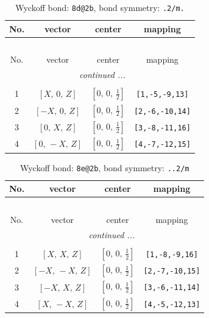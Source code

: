 \documentclass[fleqn,8pt]{jsarticle}
\begin{document}
\begin{longtable}{cccc}
\caption{Wyckoff bond: {\tt 8d@2b}, bond symmetry: {\tt .2/m.}}
 \\
 \hline \hline
No. & vector & center & mapping \\ \hline \endfirsthead

\multicolumn{3}{l}{\tablename\ \thetable{}} \\
 \hline \hline
No. & vector & center & mapping \\ \hline \endhead

 \hline \hline
\multicolumn{3}{r}{\footnotesize\it continued ...} \\ \endfoot

 \hline \hline
\multicolumn{3}{r}{} \\ \endlastfoot

1 & $\left[ X,\, 0,\, Z \right]$ & $\left[ 0,\, 0,\, \frac{1}{2} \right]$ & {\tt [1,-5,-9,13]} \\ \hline
2 & $\left[ - X,\, 0,\, Z \right]$ & $\left[ 0,\, 0,\, \frac{1}{2} \right]$ & {\tt [2,-6,-10,14]} \\ \hline
3 & $\left[ 0,\, X,\, Z \right]$ & $\left[ 0,\, 0,\, \frac{1}{2} \right]$ & {\tt [3,-8,-11,16]} \\ \hline
4 & $\left[ 0,\, - X,\, Z \right]$ & $\left[ 0,\, 0,\, \frac{1}{2} \right]$ & {\tt [4,-7,-12,15]} \\
\end{longtable}
\renewcommand{\arraystretch}{1.2}
\begin{longtable}{cccc}
\caption{Wyckoff bond: {\tt 8e@2b}, bond symmetry: {\tt ..2/m}}
 \\
 \hline \hline
No. & vector & center & mapping \\ \hline \endfirsthead

\multicolumn{3}{l}{\tablename\ \thetable{}} \\
 \hline \hline
No. & vector & center & mapping \\ \hline \endhead

 \hline \hline
\multicolumn{3}{r}{\footnotesize\it continued ...} \\ \endfoot

 \hline \hline
\multicolumn{3}{r}{} \\ \endlastfoot

1 & $\left[ X,\, X,\, Z \right]$ & $\left[ 0,\, 0,\, \frac{1}{2} \right]$ & {\tt [1,-8,-9,16]} \\ \hline
2 & $\left[ - X,\, - X,\, Z \right]$ & $\left[ 0,\, 0,\, \frac{1}{2} \right]$ & {\tt [2,-7,-10,15]} \\ \hline
3 & $\left[ - X,\, X,\, Z \right]$ & $\left[ 0,\, 0,\, \frac{1}{2} \right]$ & {\tt [3,-6,-11,14]} \\ \hline
4 & $\left[ X,\, - X,\, Z \right]$ & $\left[ 0,\, 0,\, \frac{1}{2} \right]$ & {\tt [4,-5,-12,13]} \\
\end{longtable}
\end{document}
